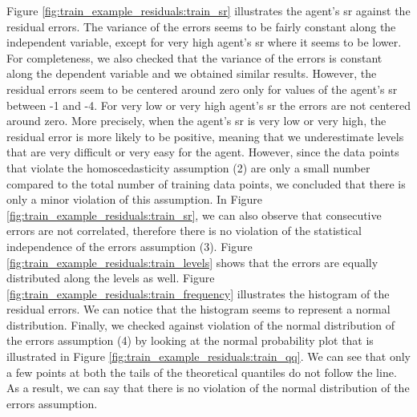 Figure \ref{fig:train_example_residuals:train_sr} illustrates the agent's \acs{sr} against the residual errors. The variance of the errors seems to be fairly constant along the independent variable, except for very high agent's \acs{sr} where it seems to be lower. For completeness, we also checked that the variance of the errors is constant along the dependent variable and we obtained similar results. However, the residual errors seem to be centered around zero only for values of the agent's \acs{sr} between -1 and -4. For very low or very high agent's \acs{sr} the errors are not centered around zero. More precisely, when the agent's \acs{sr} is very low or very high, the residual error is more likely to be positive, meaning that we underestimate levels that are very difficult or very easy for the agent. 
However, since the data points that violate the homoscedasticity assumption (2) are only a small number compared to the total number of training data points, we concluded that there is only a minor violation of this assumption.
In Figure \ref{fig:train_example_residuals:train_sr}, we can also observe that consecutive errors are not correlated, therefore there is no violation of the statistical independence of the errors assumption (3). Figure \ref{fig:train_example_residuals:train_levels} shows that the errors are equally distributed along the levels as well.
Figure \ref{fig:train_example_residuals:train_frequency} illustrates the histogram of the residual errors. We can notice that the histogram seems to represent a normal distribution. Finally, we checked against violation of the normal distribution of the errors assumption (4) by looking at the normal probability plot \cite{chambers_assessing_1983} that is illustrated in Figure \ref{fig:train_example_residuals:train_qq}. We can see that only a few points at both the tails of the theoretical quantiles do not follow the line.
As a result, we can say that there is no violation of the normal distribution of the errors assumption.  

